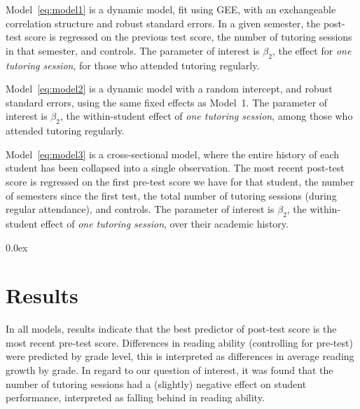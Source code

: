 \documentclass[a0,landscape]{a0poster}
\begin{document}
\begin{multicols}{3}
Model~\ref{eq:model1} is a dynamic model, fit using GEE,
with an exchangeable correlation structure and
robust standard errors.
In a given semester, the post-test score is regressed
on the previous test score,
the number of tutoring sessions in that semester,
and controls.
The parameter of interest is $\beta_2$, the
effect for \textit{one tutoring session},
for those who attended tutoring regularly.

Model~\ref{eq:model2} is a dynamic model with a random intercept,
and robust standard errors, using the same
fixed effects as Model~1.
The parameter of interest is $\beta_2$, the
within-student effect of \textit{one tutoring session},
among those who attended tutoring regularly.

Model~\ref{eq:model3} is a cross-sectional model, where the
entire history of each student has been collapsed into a
single observation.
The most recent post-test score is regressed on
the first pre-test score we have for that student,
the number of semesters since the first test,
the total number of tutoring sessions (during regular attendance),
and controls.
The parameter of interest is $\beta_2$, the
within-student effect of \textit{one tutoring session},
over their academic history.




\color{NavyBlue}
\parskip 0.0ex
\section*{Results}
%
\color{Black}
\begin{center}\vspace{1cm}

\end{center}\vspace{0.5cm}
\color{NavyBlue}
%   
In all models, results indicate that
the best predictor of post-test score is the most recent
pre-test score.
Differences in reading ability (controlling for pre-test)
were predicted by grade level, this is
interpreted as differences in average reading growth
by grade.
In regard to our question of interest, it was found that the
number of tutoring sessions
had a (slightly) negative effect on student performance,
interpreted as falling behind in reading ability. 


\end{multicols}
\end{document}
